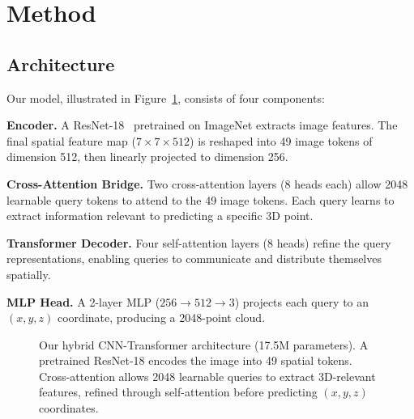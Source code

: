 \documentclass[10pt,twocolumn,letterpaper]{article}
\begin{document}
\section{Method}

\subsection{Architecture}

Our model, illustrated in Figure~\ref{fig:architecture}, consists of four components:

\textbf{Encoder.} A ResNet-18~\cite{he2016deep} pretrained on ImageNet extracts image features.
The final spatial feature map ($7 \times 7 \times 512$) is reshaped into 49 image tokens of dimension 512, then linearly projected to dimension 256.

\textbf{Cross-Attention Bridge.} Two cross-attention layers (8 heads each) allow 2048 learnable query tokens to attend to the 49 image tokens.
Each query learns to extract information relevant to predicting a specific 3D point.

\textbf{Transformer Decoder.} Four self-attention layers (8 heads) refine the query representations, enabling queries to communicate and distribute themselves spatially.

\textbf{MLP Head.} A 2-layer MLP ($256 \rightarrow 512 \rightarrow 3$) projects each query to an $(x, y, z)$ coordinate, producing a 2048-point cloud.

\begin{figure}[t]
\centering
{}
\caption{Our hybrid CNN-Transformer architecture (17.5M parameters). A pretrained ResNet-18 encodes the image into 49 spatial tokens. Cross-attention allows 2048 learnable queries to extract 3D-relevant features, refined through self-attention before predicting $(x,y,z)$ coordinates.}
\label{fig:architecture}
\end{figure}
\end{document}
